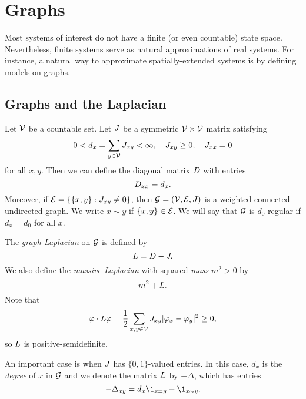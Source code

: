\section{Graphs}

Most systems of interest do not have a finite (or even countable) state space. Nevertheless, finite systems serve as natural approximations of real systems. For instance, a natural way to approximate spatially-extended systems is by defining models on graphs.


\subsection{Graphs and the Laplacian}

Let $\mathcal{V}$ be a countable set.
Let $J$ be a symmetric $\mathcal{V}\times\mathcal{V}$ matrix satisfying
\begin{equation}
0 < d_x = \sum_{y\in\mathcal{V}} J_{xy} < \infty,
  \quad
J_{xy} \ge 0,
  \quad
J_{xx} = 0
\end{equation}
for all $x, y$. Then we can define the diagonal matrix $D$ with entries
\begin{equation}
D_{xx} = d_x.
\end{equation}
Moreover, if $\mathcal{E} = \{ \{ x, y \} : J_{xy} \ne 0 \}$, then
$\mathcal{G} = (\mathcal{V}, \mathcal{E}, J)$ is a weighted connected undirected graph.
We write $x \sim y$ if $\{ x, y \} \in \mathcal{E}$. We will say that $\mathcal{G}$ is
$d_0$-regular if $d_x = d_0$ for all $x$.

The \emph{graph Laplacian} on $\mathcal{G}$ is defined by
\begin{equation}
L = D - J.
\end{equation}
We also define the \emph{massive Laplacian} with squared \emph{mass} $m^2 > 0$
by
\begin{equation}
m^2 + L.
\end{equation}
Note that
\begin{equation}
\varphi \cdot L \varphi
  =
\frac{1}{2} \sum_{x,y\in\mathcal{V}} J_{xy} |\varphi_x - \varphi_y|^2
  \ge
0,
\end{equation}
so $L$ is positive-semidefinite.

\begin{example}
An important case is when $J$ has $\{0, 1 \}$-valued entries. In this case, $d_x$ is the
\emph{degree} of $x$ in $\mathcal{G}$ and we denote the matrix $L$ by $-\Delta$, which has
entries
\begin{equation}
-\Delta_{xy} = d_x \1_{x=y} - \1_{x \sim y}.
\end{equation}
\end{example}

